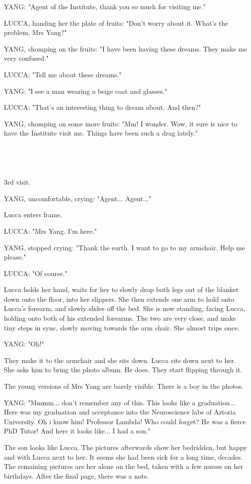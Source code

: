 \documentclass[11pt]{article}
\begin{document}
YANG: "Agent of the Institute, thank you so much for visiting me."

LUCCA, handing her the plate of fruits: "Don't worry about it.
What's the problem, Mrs Yang?"

YANG, chomping on the fruits: "I have been having these dreams. 
They make me very confused."

LUCCA: "Tell me about these dreams."

YANG: "I see a man wearing a beige coat and glasses."

LUCCA: "That's an interesting thing to dream about.
And then?"

YANG, chomping on some more fruits: "Mm! I wonder.
Wow, it sure is nice to have the Institute visit me.
Things have been such a drag lately."

\ 

\ 

3rd visit.

YANG, uncomfortable, crying: "Agent... Agent..."

Lucca enters frame.

LUCCA: "Mrs Yang.
I'm here."

YANG, stopped crying: "Thank the earth.
I want to go to my armchair.
Help me please."

LUCCA: "Of course."

Lucca holds her hand, waits for her to slowly drop both legs out of the blanket down onto the floor, into her slippers.
She then extends one arm to hold onto Lucca's forearm, and slowly slides off the bed.
She is now standing, facing Lucca, holding onto both of his extended forearms.
The two are very close, and make tiny steps in sync, slowly moving towards the arm chair.
She almost trips once.

YANG: "Oh!"

They make it to the armchair and she sits down.
Lucca sits down next to her.
She asks him to bring the photo album. 
He does.
They start flipping through it.

The young versions of Mrs Yang are barely visible.
There is a boy in the photos. 

YANG: "Mmmm... don't remember any of this.
This looks like a graduation...
Here was my graduation and acceptance into the Neuroscience labs of Aztoria University.
Oh i know him! Professor Lambda! Who could forget? He was a fierce PhD Tutor!
And here it looks like...
I had a son."

The son looks like Lucca.
The pictures afterwards show her bedridden, but happy and with Lucca next to her.
It seems she had been sick for a long time, decades.
The remaining pictures are her alone on the bed, taken with a few nurses on her birthdays.
After the final page, there was a note.
\end{document}
